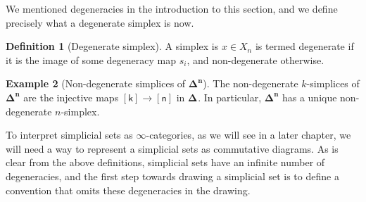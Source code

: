 \documentclass[10pt]{amsart}
\newcommand{\8}{\ensuremath{\infty}}
\newcommand{\0}{\ensuremath{\overset{\rightarrow}{0}}}
\newcommand{\1}{\ensuremath{\mathbf{1}}}
\newcommand{\Simplex}[1]{\ensuremath{\boldsymbol{\Delta^{#1}}}}
\newcommand{\sq}[1]{\ensuremath{\mathsf{[#1]}}}
\theoremstyle{definition}
\newtheorem{definition}{Definition}[section]
\newtheorem{example}[definition]{Example}
\numberwithin{definition}{subsection}
\numberwithin{definition}{section}
\begin{document}
We mentioned degeneracies in the introduction to this section, and we define precisely what a degenerate simplex is now.

\begin{definition}[Degenerate simplex]
  A simplex is $x \in X_n$ is termed degenerate if it is the image of some degeneracy map $s_i$, and non-degenerate otherwise.
\end{definition}

\begin{example}[Non-degenerate simplices of \Simplex{n}]
  The non-degenerate $k$-simplices of $\Simplex{n}$ are the injective maps $\sq{k} \rightarrow \sq{n}$ in $\Simplex{}$. In particular, $\Simplex{n}$ has a unique non-degenerate $n$-simplex.
\end{example}

To interpret simplicial sets as \8-categories, as we will see in a later chapter, we will need a way to represent a simplicial sets as commutative diagrams. As is clear from the above definitions, simplicial sets have an infinite number of degeneracies, and the first step towards drawing a simplicial set is to define a convention that omits these degeneracies in the drawing.
\end{document}
